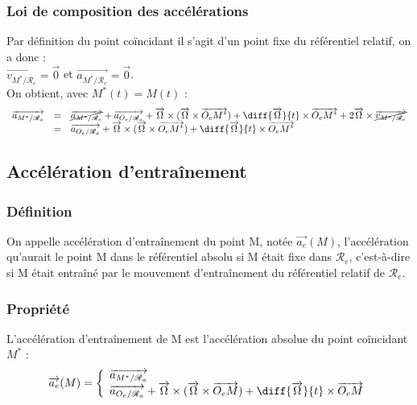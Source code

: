 \documentclass[a4paper,10pt]{book} %
\begin{document}
\subsubsection{Loi de composition des accélérations}
Par définition du point coïncidant il s'agit d'un point fixe du référentiel relatif, on a donc : \\
$\overrightarrow{v_{M^*/\mathcal{R}_e}}=\overrightarrow{0}$ et $\overrightarrow{a_{M^*/\mathcal{R}_e}}=\overrightarrow{0}$.\\

On obtient, avec $M^*(t)=M(t)$ :
$$\begin{array}{rcl}\overrightarrow{a_{M^*/\mathcal{R}_a}}&=&\cancel{\overrightarrow{a_{M^*/\mathcal{R}_e}}}+\overrightarrow{a_{O_e/\mathcal{R}_a}}+ \overrightarrow{\Omega}\times (\overrightarrow{\Omega}\times \overrightarrow{O_eM^*})+\diff{\overrightarrow{\Omega}}{t}\times \overrightarrow{O_eM^*} +2\overrightarrow{\Omega}\times \cancel{\overrightarrow{v_{M^*/\mathcal{R}_e}}}\\
&=&\overrightarrow{a_{O_e/\mathcal{R}_a}}+ \overrightarrow{\Omega}\times (\overrightarrow{\Omega}\times \overrightarrow{O_eM^*})+\diff{\overrightarrow{\Omega}}{t}\times \overrightarrow{O_eM^*}\end{array}$$

\subsection{Accélération d'entraînement}
\subsubsection{Définition}
On appelle accélération d’entraînement du point M, notée $\overrightarrow{a_e}(M)$,
l'accélération qu'aurait le point M dans le référentiel absolu si M était fixe dans $\mathcal{R}_e$, c'est-à-dire si M était entraîné par le mouvement d'entraînement du référentiel relatif de $\mathcal{R}_e$.

\subsubsection{Propriété}
L'accélération d'entraînement de M est l'accélération absolue du point coïncidant $M^*$ :
$$\overrightarrow{a_e}(M)=\left\{ \begin{array}{lll}
\overrightarrow{a_{M^*/\mathcal{R}_a}}\\
\overrightarrow{a_{O_e/\mathcal{R}_a}}+\overrightarrow{\Omega}\times (\overrightarrow{\Omega}\times \overrightarrow{O_eM})+\diff{\overrightarrow{\Omega}}{t}\times \overrightarrow{O_eM}
\end{array}\right.$$\\
\end{document}
